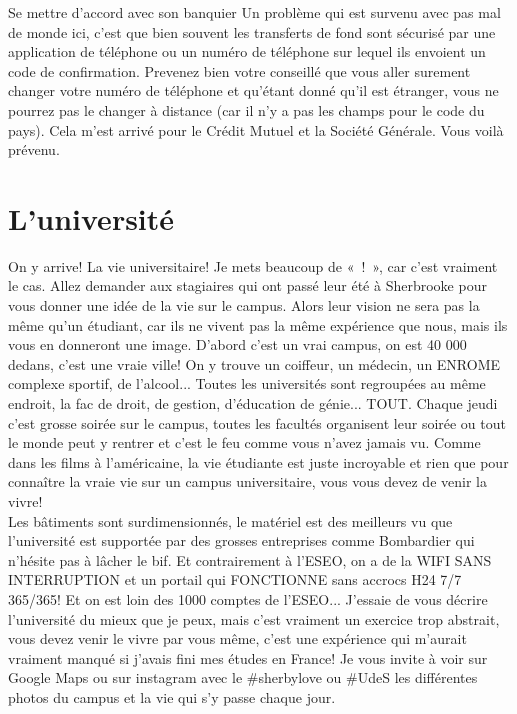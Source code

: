 \begin{example}{Se mettre d'accord avec son banquier}
  Un problème qui est survenu avec pas mal de monde ici, c'est que bien souvent les transferts de fond sont sécurisé par une application de téléphone ou un numéro de téléphone sur lequel ils envoient un code de confirmation. Prevenez bien votre conseillé que vous aller surement changer votre numéro de téléphone et qu'étant donné qu'il est étranger, vous ne pourrez pas le changer à distance (car il n'y a pas les champs pour le code du pays). Cela m'est arrivé pour le Crédit Mutuel et la Société Générale. Vous voilà prévenu.
\end{example}

\section{L’université}\label{sec:sec4.7}

On y arrive! La vie universitaire! Je mets beaucoup de « ! », car c’est vraiment le cas. Allez demander aux stagiaires qui ont passé leur été à Sherbrooke pour vous donner une idée de la vie sur le campus. Alors leur vision ne sera pas la même qu’un étudiant, car ils ne vivent pas la même expérience que nous, mais ils vous en donneront une image. D’abord c’est un vrai campus, on est 40 000 dedans, c’est une vraie ville! On y trouve un coiffeur, un médecin, un ENROME complexe sportif, de l’alcool... Toutes les universités sont regroupées au même endroit, la fac de droit, de gestion, d’éducation de génie... TOUT. Chaque jeudi c’est grosse soirée sur le campus, toutes les facultés organisent leur soirée ou tout le monde peut y rentrer et c’est le feu comme vous n’avez jamais vu. Comme dans les films à l’américaine, la vie étudiante est juste incroyable et rien que pour connaître la vraie vie sur un campus universitaire, vous vous devez de venir la vivre! \\
Les bâtiments sont surdimensionnés, le matériel est des meilleurs vu que l’université est supportée par des grosses entreprises comme Bombardier qui n’hésite pas à lâcher le bif. Et contrairement à l’ESEO, on a de la WIFI SANS INTERRUPTION et un portail qui FONCTIONNE sans accrocs H24 7/7 365/365! Et on est loin des 1000 comptes de l’ESEO...
\bigbreak
J’essaie de vous décrire l’université du mieux que je peux, mais c’est vraiment un exercice trop abstrait, vous devez venir le vivre par vous même, c’est une expérience qui m’aurait vraiment manqué si j’avais fini mes études en France!
\bigbreak
Je vous invite à voir sur Google Maps ou sur instagram avec le \#sherbylove ou \#UdeS les différentes photos du campus et la vie qui s'y passe chaque jour.


